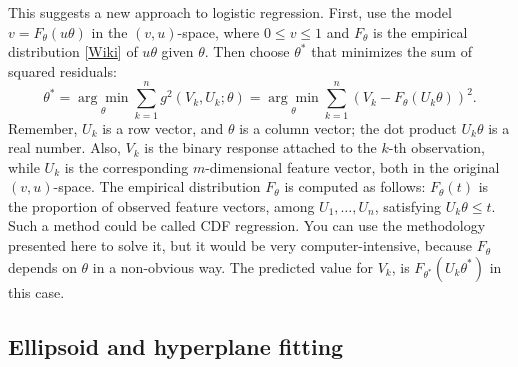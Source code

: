\documentclass[oneside,10pt]{book}
\begin{document}
This suggests a new approach to logistic regression. First, use the model $v=F_\theta(u\theta)$ in the $(v,u)$-space, where $0\leq v\leq 1$ and
$F_\theta$ is the
 \textcolor{index}{empirical distribution} [\href{https://en.wikipedia.org/wiki/Empirical_distribution_function}{Wiki}] of $u\theta$ given $\theta$. Then choose $\theta^*$ that minimizes the sum of squared residuals:
$$
\theta^* =\underset{\theta}{\arg\min}\sum_{k=1}^n g^2(V_k,U_k;\theta)=\underset{\theta}{\arg\min}\sum_{k=1}^n (V_k - F_\theta(U_k\theta))^2.
$$
 Remember, $U_k$ is a row vector, and $\theta$ is a column vector; the dot product $U_k\theta$ is a real number. Also,
 $V_k$ is the binary response attached to the $k$-th observation, while $U_k$ is the corresponding $m$-dimensional feature vector, both in the original
 $(v,u)$-space. The empirical distribution $F_\theta$ is computed as follows: $F_\theta(t)$ is the proportion of observed feature vectors, among $U_1,\dots,U_n$, satisfying  $U_k\theta\leq t$.
Such a method could be called \textcolor{index}{CDF regression}. You can use the methodology presented here to solve it, but it would be very computer-intensive, because $F_\theta$ depends on $\theta$
 in a non-obvious way. The predicted value for $V_k$, is $F_{\theta^*}(U_k\theta^*)$ in this case.


\subsection{Ellipsoid and hyperplane fitting}
\end{document}
